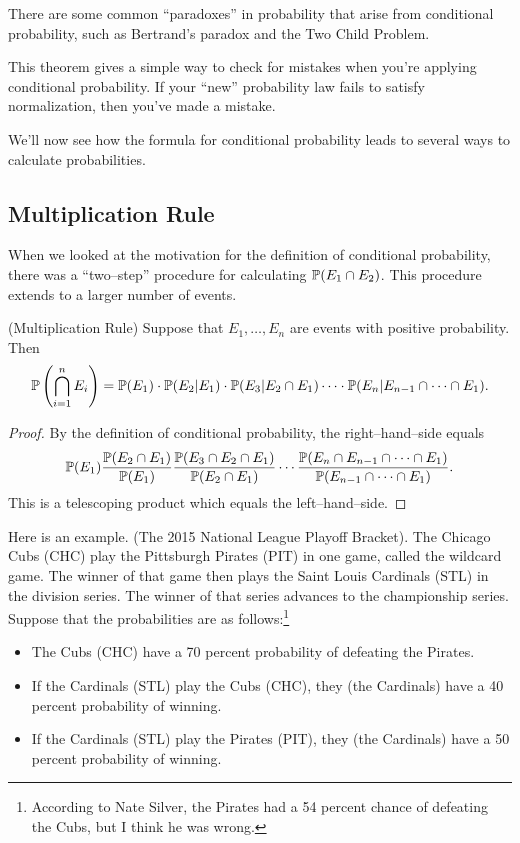 \documentclass{ximera}
\begin{document}
There are some common ``paradoxes'' in probability that arise from conditional probability, such as Bertrand's paradox and the Two Child Problem.

\Lightning \Lightning This theorem gives a simple way to check for mistakes when you're applying conditional probability. If your ``new'' probability law fails to satisfy normalization, then you've made a mistake. \Lightning\Lightning

We'll now see how the formula for conditional probability leads to several ways to calculate probabilities. 
\subsection{Multiplication Rule}
When we looked at the motivation for the definition of conditional probability, there was a ``two--step'' procedure for calculating $\mathbb{P}(E_1\cap E_2)$. This procedure extends to a larger number of events.

\begin{theorem} (Multiplication Rule)
Suppose that $E_1,\ldots,E_n$ are events with positive probability. Then
$$
\mathbb{P}\left( \bigcap_{i=1}^n E_i\right) = \mathbb{P}(E_1) \cdot  \mathbb{P}(E_2 \vert E_1) \cdot \mathbb{P}(E_3 \vert E_2 \cap E_1) \cdots \cdot \mathbb{P}(E_n \vert E_{n-1} \cap \cdots \cap E_1).
$$
\end{theorem}
\begin{proof}
By the definition of conditional probability, the right--hand--side equals
$$
\mathbb{P}(E_1) \frac{\mathbb{P}( E_2 \cap E_1)}{\mathbb{P}(E_1)} \frac{\mathbb{P}( E_3 \cap E_2\cap E_1)}{\mathbb{P}(E_2\cap E_1)} \cdots \frac{\mathbb{P}( E_n \cap E_{n-1} \cap \cdots \cap E_1)}{\mathbb{P}(E_{n-1} \cap \cdots \cap E_1)}.
$$
This is a telescoping product which equals the left--hand--side.
\end{proof}

Here is an example. (The 2015 National League Playoff Bracket). The Chicago Cubs (CHC) play the Pittsburgh Pirates (PIT) in one game, called the wildcard game. The winner of that game then plays the Saint Louis Cardinals (STL) in the division series. The winner of that series advances to the championship series. Suppose that the probabilities are as follows:\footnote{According to Nate Silver, the Pirates had a 54 percent chance of defeating the Cubs, but I think he was wrong.}

\begin{itemize}
\item
The Cubs (CHC) have a 70 percent probability of defeating the Pirates.
\item
If the Cardinals (STL) play the Cubs (CHC), they (the Cardinals) have a 40 percent probability of winning.
\item
If the Cardinals (STL) play the Pirates (PIT), they (the Cardinals) have a 50 percent probability of winning.
\end{itemize}
\end{document}
